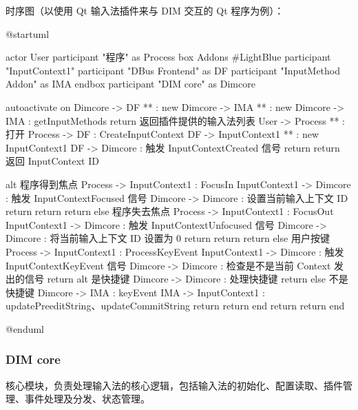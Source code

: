 \documentclass{utart}
\begin{document}
        \pagebreak
        \par 时序图（以使用 Qt 输入法插件来与 DIM 交互的 Qt 程序为例）：

        \begin{plantuml}
        @startuml

        actor User
        participant "程序" as Process
        box Addons #LightBlue
        participant "InputContext1"
        participant "DBus Frontend" as DF
        participant "InputMethod Addon" as IMA
        endbox
        participant "DIM core" as Dimcore

        autoactivate on
        Dimcore -> DF ** : new
        Dimcore -> IMA ** : new
        Dimcore -> IMA : getInputMethods
        return 返回插件提供的输入法列表
        User -> Process ** : 打开
        Process -> DF : CreateInputContext
        DF -> InputContext1 ** : new InputContext1
        DF -> Dimcore : 触发 InputContextCreated 信号
        return
        return 返回 InputContext ID

        alt 程序得到焦点
            Process -> InputContext1 : FocusIn
                InputContext1 -> Dimcore : 触发 InputContextFocused 信号
                    Dimcore -> Dimcore : 设置当前输入上下文 ID
                    return
                return
            return
        else 程序失去焦点
            Process -> InputContext1 : FocusOut
                InputContext1 -> Dimcore : 触发 InputContextUnfocused 信号
                    Dimcore -> Dimcore : 将当前输入上下文 ID 设置为 0
                    return
                return
            return
        else 用户按键
            Process -> InputContext1 : ProcessKeyEvent
                InputContext1 -> Dimcore : 触发 InputContextKeyEvent 信号
                    Dimcore -> Dimcore : 检查是不是当前 Context 发出的信号
                    return
                    alt 是快捷键
                        Dimcore -> Dimcore : 处理快捷键
                        return
                    else 不是快捷键
                        Dimcore -> IMA : keyEvent
                            IMA -> InputContext1 : updatePreeditString、updateCommitString
                            return
                        return
                    end
                return
            return
        end

        @enduml
        \end{plantuml}

        \subsubsection{DIM core}
            \par 核心模块，负责处理输入法的核心逻辑，包括输入法的初始化、配置读取、插件管理、事件处理及分发、状态管理。
\end{document}
